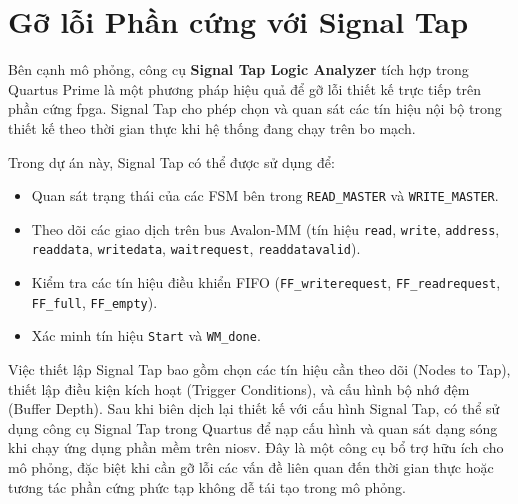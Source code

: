 \section{Gỡ lỗi Phần cứng với Signal Tap}

Bên cạnh mô phỏng, công cụ \textbf{Signal Tap Logic Analyzer} tích hợp trong Quartus Prime là một phương pháp hiệu quả để gỡ lỗi thiết kế trực tiếp trên phần cứng \acrshort{fpga}. Signal Tap cho phép chọn và quan sát các tín hiệu nội bộ trong thiết kế theo thời gian thực khi hệ thống đang chạy trên bo mạch.

Trong dự án này, Signal Tap có thể được sử dụng để:
\begin{itemize}
    \item Quan sát trạng thái của các FSM bên trong \texttt{READ\_MASTER} và \texttt{WRITE\_MASTER}.
    \item Theo dõi các giao dịch trên bus Avalon-MM (tín hiệu \texttt{read}, \texttt{write}, \texttt{address}, \texttt{readdata}, \texttt{writedata}, \texttt{waitrequest}, \texttt{readdatavalid}).
    \item Kiểm tra các tín hiệu điều khiển FIFO (\texttt{FF\_writerequest}, \texttt{FF\_readrequest}, \texttt{FF\_full}, \texttt{FF\_empty}).
    \item Xác minh tín hiệu \texttt{Start} và \texttt{WM\_done}.
\end{itemize}
Việc thiết lập Signal Tap bao gồm chọn các tín hiệu cần theo dõi (Nodes to Tap), thiết lập điều kiện kích hoạt (Trigger Conditions), và cấu hình bộ nhớ đệm (Buffer Depth). Sau khi biên dịch lại thiết kế với cấu hình Signal Tap, có thể sử dụng công cụ Signal Tap trong Quartus để nạp cấu hình và quan sát dạng sóng khi chạy ứng dụng phần mềm trên \acrshort{niosv}. Đây là một công cụ bổ trợ hữu ích cho mô phỏng, đặc biệt khi cần gỡ lỗi các vấn đề liên quan đến thời gian thực hoặc tương tác phần cứng phức tạp không dễ tái tạo trong mô phỏng.

